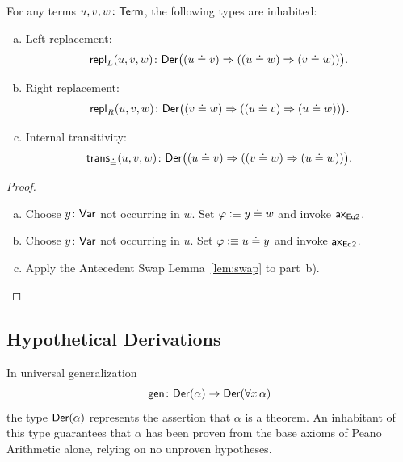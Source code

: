 \begin{lem}
    \label{lem:internal-equality}
    For any terms\/ $u,v,w\colon\fun{Term}$, the following types are inhabited:
    \begin{enumerate}[a),font=\upshape]
        \item Left replacement:
        \[
            \fun{repl}_L(u,v,w)\colon\fun{Der}\bigl(
                (u\doteq v)
                \imp
                ((u\doteq w)\imp(v\doteq w))
            \bigr).
        \]
        \item Right replacement:
        \[
            \fun{repl}_R(u,v,w)\colon\fun{Der}\bigl(
                (v\doteq w)
                \imp
                ((u\doteq v)\imp(u\doteq w))
            \bigr).
        \]
        \item Internal transitivity:
        \[
            \fun{trans}_{\doteq}(u,v,w)\colon
                \fun{Der}\bigl(
                    (u\doteq v)
                    \imp
                    ((v\doteq w)\imp(u\doteq w))
            \bigr).
        \]
    \end{enumerate}
\end{lem}

\begin{proof}\ 
    \begin{enumerate}[a),font=\upshape]
        \item Choose $y\colon\fun{Var}$ not occurring  in $w$. Set $\varphi\mathrel{\vcentcolon}\equiv y\doteq w$ and invoke $\mathsf{ax}_{\mathsf{Eq2}}$.

        \item Choose $y\colon\fun{Var}$ not occurring in $u$. Set $\varphi\mathrel{\vcentcolon}\equiv u\doteq y$ and invoke $\mathsf{ax}_{\mathsf{Eq2}}$.

        \item Apply the Antecedent Swap Lemma~\ref{lem:swap} to part~b).
    \end{enumerate}
\end{proof}

\subsection{Hypothetical Derivations}

In universal generalization
\[
    \fun{gen}\colon
        \fun{Der}(\alpha)
        \to
        \fun{Der}(\forall x\,\alpha)
\]
the type $\mathsf{Der}(\alpha)$ represents the assertion that $\alpha$ is a theorem. An inhabitant of this type guarantees that $\alpha$ has been proven from the base axioms of Peano Arithmetic alone, relying on no unproven hypotheses. 

